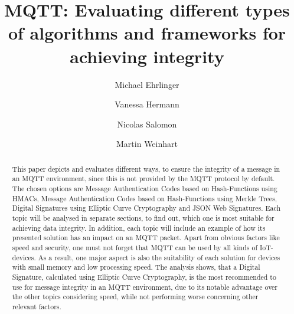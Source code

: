 \documentclass[runningheads]{llncs}
\begin{document}
\title{MQTT: Evaluating different types of algorithms and frameworks for achieving integrity}


\author{Michael Ehrlinger \and Vanessa Hermann \and Nicolas Salomon \and Martin Weinhart}



\maketitle


\begin{abstract}
This paper depicts and evaluates different ways, to ensure the integrity of a message in an MQTT environment, since this is not provided by the MQTT protocol by default. The chosen options are Message Authentication Codes based on Hash-Functions using HMACs, Message Authentication Codes based on Hash-Functions using Merkle Trees, Digital Signatures using Elliptic Curve Cryptography and JSON Web Signatures. Each topic will be analysed in separate sections, to find out, which one is most suitable for achieving data integrity. In addition, each topic will include an example of how its presented solution has an impact on an MQTT packet. Apart from obvious factors like speed and security, one must not forget that MQTT can be used by all kinds of IoT-devices. As a result, one major aspect is also the suitability of each solution for devices with small memory and low processing speed. The analysis shows, that a Digital Signature, calculated using Elliptic Curve Cryptography, is the most recommended to use for message integrity in an MQTT environment, due to its notable advantage over the other topics considering speed, while not performing worse concerning other relevant factors.
\newline

\end{abstract}



\newpage








%
%
\newpage


%
\end{document}
